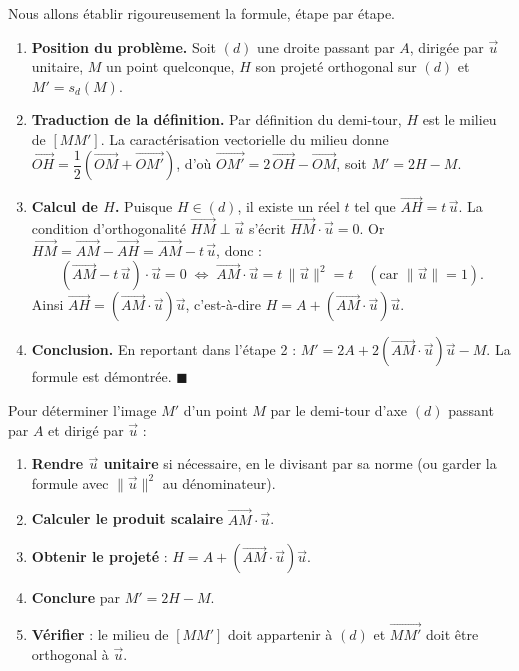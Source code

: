 \documentclass[11pt]{article}
\begin{document}
\begin{experience}[Démonstration guidée de la formule $M' = 2H - M$]
Nous allons établir rigoureusement la formule, étape par étape.
\begin{enumerate}
\item \textbf{Position du problème.} Soit $(d)$ une droite passant par $A$, dirigée par $\vec{u}$ unitaire, $M$ un point quelconque, $H$ son projeté orthogonal sur $(d)$ et $M' = s_d(M)$.
\item \textbf{Traduction de la définition.} Par définition du demi-tour, $H$ est le milieu de $[MM']$. La caractérisation vectorielle du milieu donne $\overrightarrow{OH} = \dfrac{1}{2}\left(\overrightarrow{OM} + \overrightarrow{OM'}\right)$, d'où $\overrightarrow{OM'} = 2\,\overrightarrow{OH} - \overrightarrow{OM}$, soit $M' = 2H - M$.
\item \textbf{Calcul de $H$.} Puisque $H \in (d)$, il existe un réel $t$ tel que $\overrightarrow{AH} = t\,\vec{u}$. La condition d'orthogonalité $\overrightarrow{HM} \perp \vec{u}$ s'écrit $\overrightarrow{HM}\cdot\vec{u} = 0$. Or $\overrightarrow{HM} = \overrightarrow{AM} - \overrightarrow{AH} = \overrightarrow{AM} - t\,\vec{u}$, donc :
\[
\left(\overrightarrow{AM} - t\,\vec{u}\right)\cdot\vec{u} = 0
\;\Longleftrightarrow\;
\overrightarrow{AM}\cdot\vec{u} = t\,\|\vec{u}\|^{2} = t
\quad(\text{car } \|\vec{u}\| = 1).
\]
Ainsi $\overrightarrow{AH} = \left(\overrightarrow{AM}\cdot\vec{u}\right)\vec{u}$, c'est-à-dire $H = A + \left(\overrightarrow{AM}\cdot\vec{u}\right)\vec{u}$.
\item \textbf{Conclusion.} En reportant dans l'étape 2 : $M' = 2A + 2\left(\overrightarrow{AM}\cdot\vec{u}\right)\vec{u} - M$. La formule est démontrée. $\blacksquare$
\end{enumerate}
\end{experience}

\begin{methode}
Pour déterminer l'image $M'$ d'un point $M$ par le demi-tour d'axe $(d)$ passant par $A$ et dirigé par $\vec{u}$ :
\begin{enumerate}
\item \textbf{Rendre $\vec{u}$ unitaire} si nécessaire, en le divisant par sa norme (ou garder la formule avec $\|\vec{u}\|^2$ au dénominateur).
\item \textbf{Calculer le produit scalaire} $\overrightarrow{AM}\cdot\vec{u}$.
\item \textbf{Obtenir le projeté} : $H = A + \left(\overrightarrow{AM}\cdot\vec{u}\right)\vec{u}$.
\item \textbf{Conclure} par $M' = 2H - M$.
\item \textbf{Vérifier} : le milieu de $[MM']$ doit appartenir à $(d)$ et $\overrightarrow{MM'}$ doit être orthogonal à $\vec{u}$.
\end{enumerate}
\end{methode}
\end{document}

